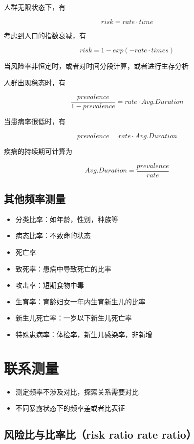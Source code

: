 \documentclass[]{book}
\providecommand{\tightlist}{%
  \setlength{\itemsep}{0pt}\setlength{\parskip}{0pt}}
\begin{document}
人群无限状态下，有

\[risk = rate \cdot time\]

考虑到人口的指数衰减，有

\[risk = 1 - exp(- rate \cdot times)\]

当风险率非恒定时，或者对时间分段计算，或者进行生存分析

人群出现稳态时，有

\[\frac{prevalence}{1-prevalence} = rate \cdot Avg.Duration\]

当患病率很低时，有

\[prevalence = rate \cdot Avg.Duration\]

疾病的持续期可计算为

\[Avg.Duration = \frac{prevalence}{rate}\]

\hypertarget{ux5176ux4ed6ux9891ux7387ux6d4bux91cf}{%
\subsection{其他频率测量}\label{ux5176ux4ed6ux9891ux7387ux6d4bux91cf}}

\begin{itemize}
\tightlist
\item
  分类比率：如年龄，性别，种族等
\item
  病态比率：不致命的状态
\item
  死亡率
\item
  致死率：患病中导致死亡的比率
\item
  攻击率：短期食物中毒
\item
  生育率：育龄妇女一年内生育新生儿的比率
\item
  新生儿死亡率：一岁以下新生儿死亡率
\item
  特殊患病率：体检率，新生儿感染率，非新增
\end{itemize}

\hypertarget{ux8054ux7cfbux6d4bux91cf}{%
\section{联系测量}\label{ux8054ux7cfbux6d4bux91cf}}

\begin{itemize}
\tightlist
\item
  测定频率不涉及对比，探索关系需要对比
\item
  不同暴露状态下的频率差或者比表征
\end{itemize}

\hypertarget{ux98ceux9669ux6bd4ux4e0eux6bd4ux7387ux6bd4risk-ratio-rate-ratio}{%
\subsection{风险比与比率比（risk ratio rate ratio）}\label{ux98ceux9669ux6bd4ux4e0eux6bd4ux7387ux6bd4risk-ratio-rate-ratio}}
\end{document}
